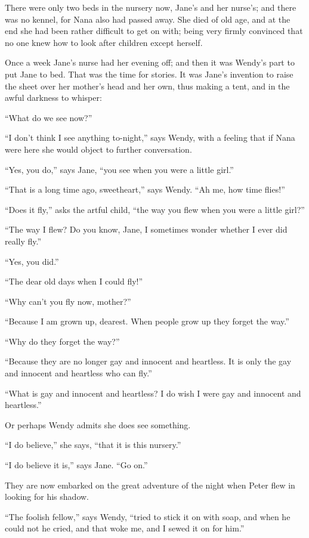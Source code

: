 There were only two beds in the nursery now, Jane’s and her nurse’s;
and there was no kennel, for Nana also had passed away.
She died of old age, and at the end she had been rather difficult to get on with;
being very firmly convinced that no one knew how to look after children except herself.

Once a week Jane’s nurse had her evening off;
and then it was Wendy’s part to put Jane to bed.
That was the time for stories.
It was Jane’s invention to raise the sheet over her mother’s head and her own, thus making a tent,
and in the awful darkness to whisper:

“What do we see now?”

“I don’t think I see anything to-night,” says Wendy,
with a feeling that if Nana were here she would object to further conversation.

“Yes, you do,” says Jane, “you see when you were a little girl.”

“That is a long time ago, sweetheart,” says Wendy.
“Ah me, how time flies!”

“Does it fly,” asks the artful child, “the way you flew when you were a little girl?”

“The way I flew?
Do you know, Jane, I sometimes wonder whether I ever did really fly.”

“Yes, you did.”

“The dear old days when I could fly!”

“Why can’t you fly now, mother?”

“Because I am grown up, dearest.
When people grow up they forget the way.”

“Why do they forget the way?”

“Because they are no longer gay and innocent and heartless.
It is only the gay and innocent and heartless who can fly.”

“What is gay and innocent and heartless?
I do wish I were gay and innocent and heartless.”

Or perhaps Wendy admits she does see something.

“I do believe,” she says, “that it is this nursery.”

“I do believe it is,” says Jane.
“Go on.”

They are now embarked on the great adventure of the night when Peter flew in looking for his shadow.

“The foolish fellow,” says Wendy, “tried to stick it on with soap,
and when he could not he cried, and that woke me, and I sewed it on for him.”

